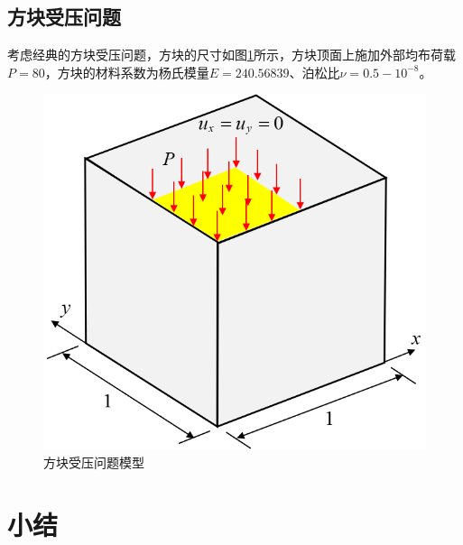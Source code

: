 \subsection{方块受压问题}
考虑经典的方块受压问题，方块的尺寸如图\ref{ch_4:fig:cube}所示，方块顶面上施加外部均布荷载$P=80$，方块的材料系数为杨氏模量$E=240.56839$、泊松比$\nu=0.5-10^{-8}$。
\begin{figure}[!h]
    \centering 
        \includegraphics[scale=0.8]{figures/cube.png}
        \caption{方块受压问题模型}\label{ch_4:fig:cube}
\end{figure}

\section{小结}


